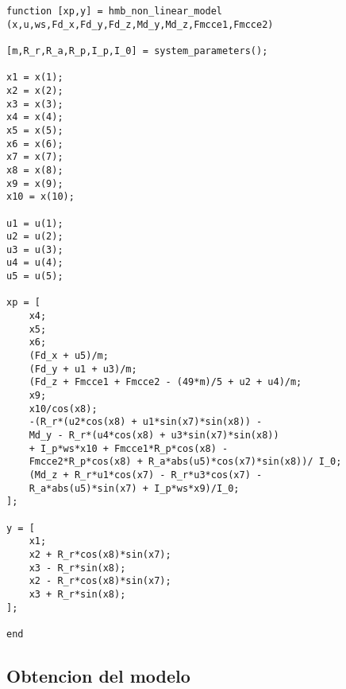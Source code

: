 \begin{lstlisting}[frame=single]
function [xp,y] = hmb_non_linear_model
(x,u,ws,Fd_x,Fd_y,Fd_z,Md_y,Md_z,Fmcce1,Fmcce2)

[m,R_r,R_a,R_p,I_p,I_0] = system_parameters();

x1 = x(1);
x2 = x(2);
x3 = x(3);
x4 = x(4);
x5 = x(5);
x6 = x(6);
x7 = x(7);
x8 = x(8);
x9 = x(9);
x10 = x(10);

u1 = u(1);
u2 = u(2);
u3 = u(3);
u4 = u(4);
u5 = u(5);

xp = [
	x4;
	x5;
	x6;
	(Fd_x + u5)/m;
	(Fd_y + u1 + u3)/m;
	(Fd_z + Fmcce1 + Fmcce2 - (49*m)/5 + u2 + u4)/m;
	x9;
	x10/cos(x8);
	-(R_r*(u2*cos(x8) + u1*sin(x7)*sin(x8)) - 
	Md_y - R_r*(u4*cos(x8) + u3*sin(x7)*sin(x8))   	
	+ I_p*ws*x10 + Fmcce1*R_p*cos(x8) - 
	Fmcce2*R_p*cos(x8) + R_a*abs(u5)*cos(x7)*sin(x8))/ I_0;
	(Md_z + R_r*u1*cos(x7) - R_r*u3*cos(x7) - 
	R_a*abs(u5)*sin(x7) + I_p*ws*x9)/I_0;
];

y = [
	x1;
	x2 + R_r*cos(x8)*sin(x7);
	x3 - R_r*sin(x8);
	x2 - R_r*cos(x8)*sin(x7);
	x3 + R_r*sin(x8);
];

end

\end{lstlisting}

\subsection{Obtencion del modelo}

